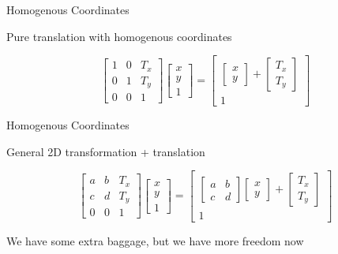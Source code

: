 \documentclass{beamer}
\begin{document}
\begin{frame}{Homogenous Coordinates}

Pure translation with homogenous coordinates

\[ \left[ \begin{array}{ccc} 1 & 0 & T_x \\ 0 & 1 & T_y \\ 0 & 0 & 1 \end{array} \right] \left[ \begin{array}{c} x \\ y \\ 1 \end{array} \right] = \left[  \begin{array}{c}  \left[ \begin{array}{c} x \\ y \end{array} \right] + \left[ \begin{array}{c} T_x \\ T_y \end{array} \right]  \\ 1 \end{array}  \right] \]

\end{frame}

\begin{frame}{Homogenous Coordinates}

General 2D transformation + translation

\[ \left[ \begin{array}{ccc} a & b & T_x \\ c & d & T_y \\ 0 & 0 & 1 \end{array} \right] \left[ \begin{array}{c} x \\ y \\ 1 \end{array} \right] = \left[  \begin{array}{c} \left[ \begin{array}{cc} a & b \\ c & d \end{array} \right] \left[ \begin{array}{c} x \\ y \end{array} \right] + \left[ \begin{array}{c} T_x \\ T_y \end{array} \right]  \\ 1 \end{array}  \right] \]

We have some extra baggage, but we have more freedom now

\end{frame}
\end{document}

